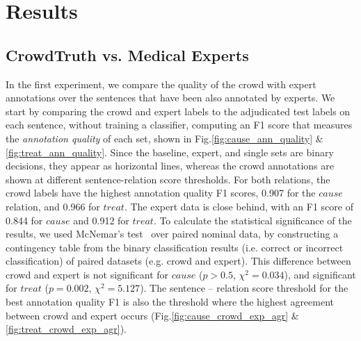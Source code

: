 \section{Results}

\subsection{CrowdTruth vs. Medical Experts}

In the first experiment, we compare the quality of the crowd with expert annotations over the sentences that have been also annotated by experts.  We start by comparing the crowd and expert labels to the adjudicated test labels on each sentence, without training a classifier, computing an F1 score that measures the {\em annotation quality} of each set, shown in Fig.\ref{fig:cause_ann_quality} \& \ref{fig:treat_ann_quality}. Since the baseline, expert, and single sets are binary decisions, they appear as horizontal lines, whereas the crowd annotations are shown at different sentence-relation score thresholds. For both relations, the crowd labels have the highest annotation quality F1 scores, 0.907 for the $cause$ relation, and 0.966 for $treat$. The expert data is close behind, with an F1 score of 0.844 for $cause$ and 0.912 for $treat$. To calculate the statistical significance of the results, we used McNemar's test~\cite{mcnemar1947note} over paired nominal data, by constructing a contingency table from the binary classification results (i.e. correct or incorrect classification) of paired datasets (e.g. crowd and expert). This difference between crowd and expert is not significant for $cause$ ($p > 0.5$, $\chi^2 = 0.034$), and significant for $treat$ ($p = 0.002$, $\chi^2 = 5.127$). The sentence -- relation score threshold for the best annotation quality F1 is also the threshold where the highest agreement between crowd and expert occurs (Fig.\ref{fig:cause_crowd_exp_agr} \& \ref{fig:treat_crowd_exp_agr}).

